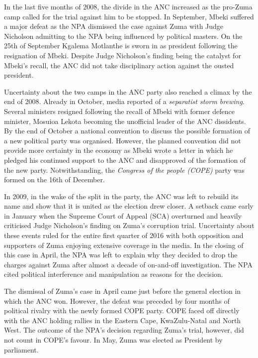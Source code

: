 \documentclass[11pt,preprint, authoryear]{elsarticle}
\numberwithin{equation}{section}
\numberwithin{figure}{section}
\numberwithin{table}{section}
\begin{document}
In the last five months of 2008, the divide in the ANC increased as the
pro-Zuma camp called for the trial against him to be stopped. In
September, Mbeki suffered a major defeat as the NPA dismissed the case
against Zuma with Judge Nicholson admitting to the NPA being influenced
by political masters. On the 25th of September Kgalema Motlanthe is
sworn in as president following the resignation of Mbeki. Despite Judge
Nicholson's finding being the catalyst for Mbeki's recall, the ANC did
not take disciplinary action against the ousted president.

Uncertainty about the two camps in the ANC party also reached a climax
by the end of 2008. Already in October, media reported of a
\emph{separatist storm brewing}. Several ministers resigned following
the recall of Mbeki with former defence minister, Mosuioa Lekota
becoming the unofficial leader of the ANC dissidents. By the end of
October a national convention to discuss the possible formation of a new
political party was organised. However, the planned convention did
not provide more certainty in the economy as Mbeki wrote a letter in
which he pledged his continued support to the ANC and disapproved of
the formation of the new party. Notwithstanding, the
\emph{Congress of the people (COPE)} party was formed on the 16th of
December.

In 2009, in the wake of the split in the party, the ANC was left to
rebuild its name and show that it is united as the election drew closer.
A setback came early in January when the Supreme Court of Appeal (SCA)
overturned and heavily criticised Judge Nicholson's finding on Zuma's
corruption trial. Uncertainty about these events ruled for the entire
first quarter of 2016 with both opposition and supporters of Zuma
enjoying extensive coverage in the media. In the closing of this case in
April, the NPA was left to explain why they decided to drop the charges
against Zuma after almost a decade of on-and-off investigation. The NPA
cited political interference and manipulation as reasons for the
decision.

The dismissal of Zuma's case in April came just before the general
election in which the ANC won. However, the defeat was preceded by four
months of political rivalry with the newly formed COPE party. COPE faced
off directly with the ANC holding rallies in the Eastern Cape,
KwaZulu-Natal and North West. The outcome of the NPA's decision
regarding Zuma's trial, however, did not count in COPE's favour. In May,
Zuma was elected as President by parliament.
\end{document}
